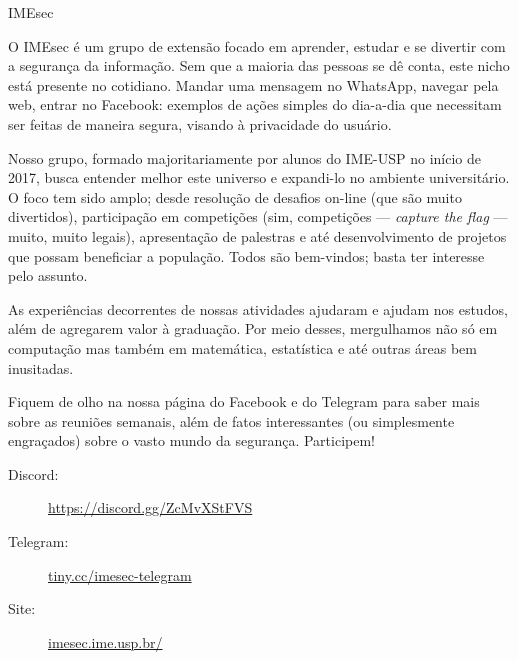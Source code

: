 \begin{subsecao}{IMEsec}


O IMEsec é um grupo de extensão focado em aprender, estudar e se divertir com a
segurança da informação. Sem que a maioria das pessoas se dê conta, este nicho
está presente no cotidiano. Mandar uma mensagem no WhatsApp, navegar pela web,
entrar no Facebook: exemplos de ações simples do dia-a-dia que necessitam ser
feitas de maneira segura, visando à privacidade do usuário.

Nosso grupo, formado majoritariamente por alunos do IME-USP no início de 2017,
busca entender melhor este universo e expandi-lo no ambiente universitário. O
foco tem sido amplo; desde resolução de desafios on-line (que são muito
divertidos), participação em competições (sim, competições — \textit{capture the
flag} — muito, muito legais), apresentação de palestras e até desenvolvimento de
projetos que possam beneficiar a população. Todos são bem-vindos; basta ter
interesse pelo assunto.

As experiências decorrentes de nossas atividades ajudaram e ajudam nos estudos,
além de agregarem valor à graduação. Por meio desses, mergulhamos não só em
computação mas também em matemática, estatística e até outras áreas bem
inusitadas.

Fiquem de olho na nossa página do Facebook e do Telegram para saber mais sobre
as reuniões semanais, além de fatos interessantes (ou simplesmente engraçados)
sobre o vasto mundo da segurança. Participem!

\begin{description}
  \item[Discord:] \url{https://discord.gg/ZcMvXStFVS}
  \item[Telegram:] \url{tiny.cc/imesec-telegram}
  \item[Site:] \url{imesec.ime.usp.br/}
\end{description}

\end{subsecao}
